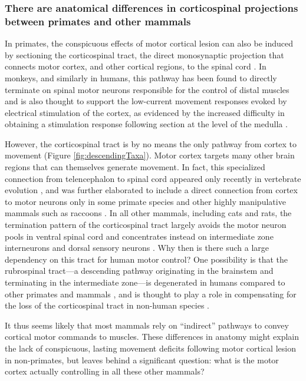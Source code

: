 \subsubsection*{There are anatomical differences in corticospinal projections between primates and other mammals}

In primates, the conspicuous effects of motor cortical lesion can also be induced by sectioning the corticospinal tract, the direct monosynaptic projection that connects motor cortex, and other cortical regions, to the spinal cord \cite{Tower1940,Lawrence1968}. In monkeys, and similarly in humans, this pathway has been found to directly terminate on spinal motor neurons responsible for the control of distal muscles \cite{Leyton1917,Bernhard1954} and is also thought to support the low-current movement responses evoked by electrical stimulation of the cortex, as evidenced by the increased difficulty in obtaining a stimulation response following section at the level of the medulla \cite{Woolsey1972}.

However, the corticospinal tract is by no means the only pathway from cortex to movement (Figure \ref{fig:descendingTaxa}). Motor cortex targets many other brain regions that can themselves generate movement. In fact, this specialized connection from telencephalon to spinal cord appeared only recently in vertebrate evolution \cite{TenDonkelaar2009}, and was further elaborated to include a direct connection from cortex to motor neurons only in some primate species and other highly manipulative mammals such as raccoons \cite{Heffner1983}. In all other mammals, including cats and rats, the termination pattern of the corticospinal tract largely avoids the motor neuron pools in ventral spinal cord and concentrates instead on intermediate zone interneurons and dorsal sensory neurons \cite{Kuypers1981,Yang2003}. Why then is there such a large dependency on this tract for human motor control? One possibility is that the rubrospinal tract---a descending pathway originating in the brainstem and terminating in the intermediate zone---is degenerated in humans compared to other primates and mammals \cite{Nathan1955,Nathan1982}, and is thought to play a role in compensating for the loss of the corticospinal tract in non-human species \cite{Lawrence1968a,Zaaimi2012}.

It thus seems likely that most mammals rely on ``indirect'' pathways to convey cortical motor commands to muscles. These differences in anatomy might explain the lack of conspicuous, lasting movement deficits following motor cortical lesion in non-primates, but leaves behind a significant question: what is the motor cortex actually controlling in all these other mammals?

